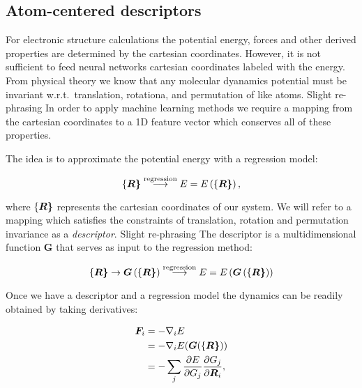 \subsection{Atom-centered descriptors}
For electronic structure calculations the potential energy,
forces and other derived properties are determined by
the cartesian coordinates. However, it is not sufficient
to feed neural networks cartesian coordinates labeled with
the energy. From physical theory we know that any molecular dyanamics potential
must be invariant w.r.t.\ translation, rotationa, and permutation of like atoms. {\color{red} Slight re-phrasing}
In order to apply machine learning methods we require a mapping from
the cartesian coordinates to a 1D feature vector which conserves
all of these properties.
\par
The idea is to approximate the potential energy with a regression model:

\begin{equation}
\left\{\bm{R\right\}} \overset{\text{regression}}{\longrightarrow}
E = E\left( \left\{\bm{R\right\}} \right) ,
\end{equation}

where $\left\{\bm{R\right\}}$ represents the cartesian coordinates of our system.
We will refer to a mapping which satisfies the constraints of translation, rotation
and permutation invariance as a \textit{descriptor}. {\color{red} Slight re-phrasing}
The descriptor is a multidimensional function $\bm{G}$ that serves as input to
the regression method:

\begin{equation}
\left\{\bm{R\right\}} \rightarrow \bm{G} \left(\left\{\bm{R\right\}} \right)
\overset{\text{regression}}{\longrightarrow}
E = E \left(\bm{G}\left(\left\{\bm{R\right\}}\right)\right)
\end{equation}

Once we have a descriptor and a regression model the dynamics
can be readily obtained by taking derivatives:

\begin{equation}
\begin{split}
    \bm{F}_i &= -\nabla_i E \\
    &= -\nabla_i
    E(\bm{G}(\left\{\bm{R\right\}})) \\
    &= -\sum_j \frac{\partial E}
    {\partial G_j} \frac{\partial G_j}{\partial \bm{R}_i} ,
\end{split}
\end{equation}

